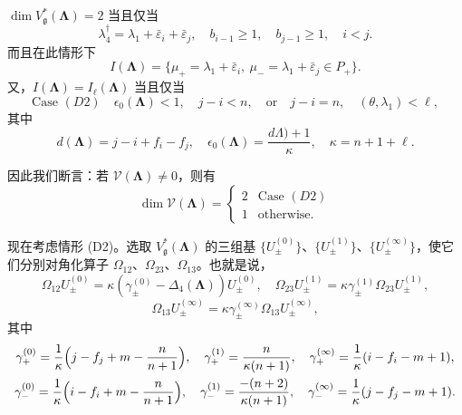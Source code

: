\begin{lemma}[6.22]
$\dim V_{\mathfrak{g}}^*(\mathbf{\Lambda})=2$ 当且仅当
\begin{equation}
\lambda_4^\dagger=\lambda_1+\bar\varepsilon_i+\bar\varepsilon_j,\quad
b_{i-1}\ge1,\quad b_{j-1}\ge1,\quad i<j.
\tag{6.37}
\end{equation}
而且在此情形下
\[
I(\mathbf{\Lambda})=\{\mu_+=\lambda_1+\bar\varepsilon_i,\
\mu_-=\lambda_1+\bar\varepsilon_j\in P_+\}.
\]
又，$I(\mathbf{\Lambda})=I_\ell(\mathbf{\Lambda})$ 当且仅当
\[
\text{Case }(D2)\quad\epsilon_0(\mathbf{\Lambda})<1,\quad j-i<n,\quad
\text{or}\quad j-i=n,\quad(\theta,\lambda_1)<\ell,
\]
其中
\[
d(\mathbf{\Lambda})=j-i+f_i-f_j,\quad
\epsilon_0(\mathbf{\Lambda})=\frac{d\Lambda)+1}{\kappa},\quad
\kappa=n+1+\ell.
\]
\end{lemma}

因此我们断言：若 $\mathcal V(\mathbf{\Lambda})\neq0$，则有
\[
\dim\mathcal V(\mathbf{\Lambda})=
\begin{cases}
2 & \text{Case }(D2)\\[2pt]
1 & \text{otherwise}.
\end{cases}
\]

现在考虑情形 (D2)。选取 $V_{\mathfrak{g}}^*(\mathbf{\Lambda})$ 的三组基
$\{U_\pm^{(0)}\}$、$\{U_\pm^{(1)}\}$、$\{U_\pm^{(\infty)}\}$，使它们分别对角化算子
$\Omega_{12}$、$\Omega_{23}$、$\Omega_{13}$。也就是说，
\[
\Omega_{12}U_\pm^{(0)}=\kappa(\gamma_\pm^{(0)}-\Delta_4(\mathbf{\Lambda}))U_\pm^{(0)},
\quad
\Omega_{23}U_\pm^{(1)}=\kappa\gamma_\pm^{(1)}\Omega_{23}U_\pm^{(1)},
\]
\[
\Omega_{13}U_\pm^{(\infty)}=\kappa\gamma_\pm^{(\infty)}\Omega_{13}U_\pm^{(\infty)},
\]
其中
\[
\begin{gathered}
\gamma_+^{(0)}=\frac{1}{\kappa}\Bigl(j-f_j+m-\frac{n}{n+1}\Bigr),\quad
\gamma_+^{(1)}=\frac{n}{\kappa(n+1)},\quad
\gamma_+^{(\infty)}=\frac{1}{\kappa}(i-f_i-m+1),\\
\gamma_-^{(0)}=\frac{1}{\kappa}\Bigl(i-f_i+m-\frac{n}{n+1}\Bigr),\quad
\gamma_-^{(1)}=\frac{-(n+2)}{\kappa(n+1)},\quad
\gamma_-^{(\infty)}=\frac{1}{\kappa}(j-f_j-m+1).
\end{gathered}
\]

